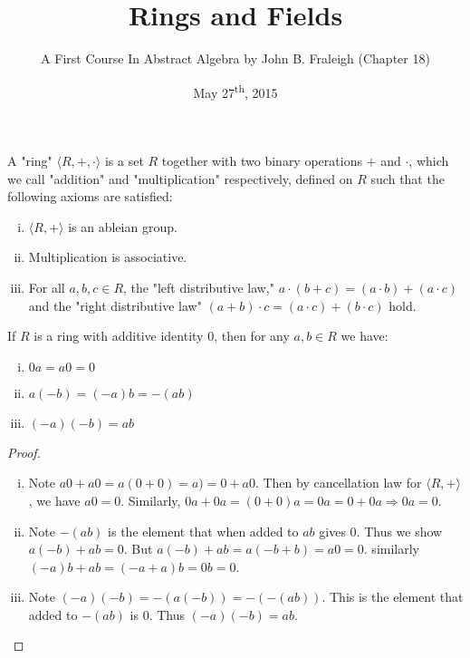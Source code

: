 \documentclass[a4paper,11pt]{article}
\title{Rings and Fields}
\author{A First Course In Abstract Algebra by John B. Fraleigh (Chapter 18)}
\date{May 27\textsuperscript{th}, 2015}
\begin{document}
\maketitle
{}

\begin{outline}

    A "ring" \(\langle R, +, \cdot \rangle\) is a set \(R\) together with two binary operations
    \(+\) and \(\cdot\), which we call "addition" and "multiplication" respectively, defined on \(R\) such that the
    following axioms are satisfied:
    \begin{enumerate}[i.]
      \item \(\langle R, + \rangle\) is an ableian group.
      \item Multiplication is associative.
      \item For all \(a, b, c \in R\), the "left distributive law," \(a \cdot (b + c) = (a \cdot b) + (a \cdot c)\) and
      the "right distributive law" \((a + b) \cdot c = (a \cdot c) + (b \cdot c)\) hold.
    \end{enumerate}

    If \(R\) is a ring with additive identity \(0\), then for any \(a, b \in R\) we have:
    \begin{enumerate}[i.]
      \item \(0a = a0 = 0\)
      \item \(a(-b) = (-a)b = -(ab)\)
      \item \((-a)(-b) = ab\)
    \end{enumerate}
    
    \begin{proof}
      \begin{enumerate}[i.]
        \item 
          Note \(a0 + a0 = a(0 + 0) = a) = 0 + a0\). Then by cancellation law for \(\langle R, + \rangle\), we have 
          \(a0 = 0\). Similarly, \(0a + 0a = (0 + 0)a = 0a = 0 + 0a \Rightarrow 0a = 0\).
        \item 
          Note \(-(ab)\) is the element that when added to \(ab\) gives \(0\). Thus we show \(a(-b) + ab = 0\). But
          \(a(-b) + ab = a(-b + b) = a0 = 0\). similarly \((-a)b + ab = (-a + a)b = 0b = 0\).
        \item 
          Note \((-a)(-b) = -(a(-b)) = -(-(ab))\). This is the element that added to \(-(ab)\) is \(0\). Thus
          \((-a)(-b) = ab\).
      \end{enumerate}
    \end{proof}
      

\end{outline}
\end{document}

